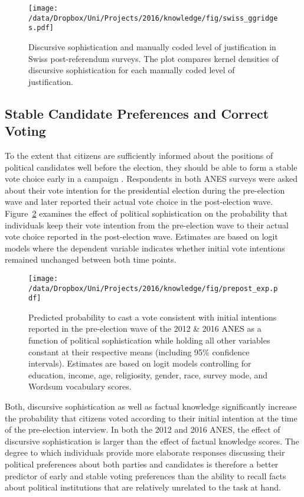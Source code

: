 \begin{figure}[h]\centering
\texttt{[image: /data/Dropbox/Uni/Projects/2016/knowledge/fig/swiss\_ggridges.pdf]}
\caption{Discursive sophistication and manually coded level of justification \citep{colombo2016justifications} in Swiss post-referendum surveys. The plot compares kernel densities of discursive sophistication for each manually coded level of justification.}\label{fig:swiss_ggridges}
\end{figure}


\subsection*{Stable Candidate Preferences and Correct Voting}
To the extent that citizens are sufficiently informed about the positions of political candidates well before the election, they should be able to form a stable vote choice early in a campaign \citep[e.g.,][]{gelman1993american,nir2008campaign}. Respondents in both ANES surveys were asked about their vote intention for the presidential election during the pre-election wave and later reported their actual vote choice in the post-election wave. Figure~\ref{fig:prepost} examines the effect of political sophistication on the probability that individuals keep their vote intention from the pre-election wave to their actual vote choice reported in the post-election wave. Estimates are based on logit models where the dependent variable indicates whether initial vote intentions remained unchanged between both time points.

\begin{figure}[h]\centering
\texttt{[image: /data/Dropbox/Uni/Projects/2016/knowledge/fig/prepost\_exp.pdf]}
\caption{Predicted probability to cast a vote consistent with initial intentions reported in the pre-election wave of the 2012 \& 2016 ANES as a function of political sophistication while holding all other variables constant at their respective means (including 95\% confidence intervals). Estimates are based on logit models controlling for education, income, age, religiosity, gender, race, survey mode, and Wordsum vocabulary scores.}\label{fig:prepost}
\end{figure}

Both, discursive sophistication as well as factual knowledge significantly increase the probability that citizens voted according to their initial intention at the time of the pre-election interview. In both the 2012 and 2016 ANES, the effect of discursive sophistication is larger than the effect of factual knowledge scores. The degree to which individuals provide more elaborate responses discussing their political preferences about both parties and candidates is therefore a better predictor of early and stable voting preferences than the ability to recall facts about political institutions that are relatively unrelated to the task at hand.

